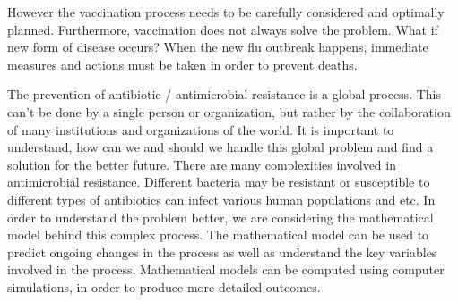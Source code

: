 However the vaccination process needs to be carefully considered and optimally planned. Furthermore, vaccination does not always solve the problem. What if new form of disease occurs? When the new flu outbreak happens, immediate measures and actions must be taken in order to prevent deaths.

The prevention of antibiotic / antimicrobial resistance is a global process. This can’t be done by a single person or organization, but rather by the collaboration of many institutions and organizations of the world. It is important to understand, how can we and should we handle this global problem and find a solution for the better future. There are many complexities involved in antimicrobial resistance. Different bacteria may be resistant or susceptible to different types of antibiotics can infect various human populations and etc. In order to understand the problem better, we are considering the mathematical model behind this complex process. The mathematical model can be used to predict ongoing changes in the process as well as understand the key variables involved in the process. Mathematical models can be computed using computer simulations, in order to produce more detailed outcomes.


